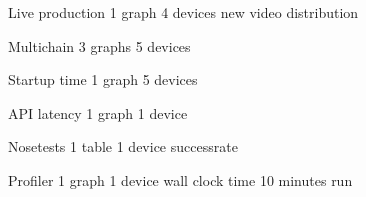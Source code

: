 Live production
1 graph
4 devices
new video distribution


Multichain
3 graphs
5 devices


Startup time
1 graph
5 devices


API latency
1 graph
1 device


Nosetests
1 table
1 device
successrate


Profiler
1 graph
1 device
wall clock time
10 minutes run



